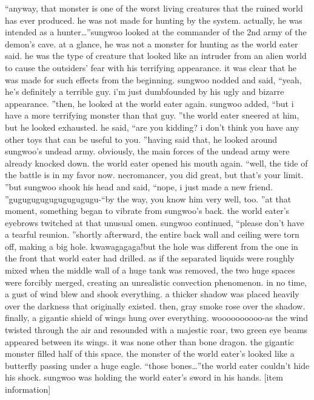 “anyway, that monster is one of the worst living creatures that the ruined world has ever produced.
 he was not made for hunting by the system.
 actually, he was intended as a hunter…”sungwoo looked at the commander of the 2nd army of the demon’s cave.
 at a glance, he was not a monster for hunting as the world eater said.
 he was the type of creature that looked like an intruder from an alien world to cause the outsiders’ fear with his terrifying appearance.
 it was clear that he was made for such effects from the beginning.
sungwoo nodded and said, “yeah, he’s definitely a terrible guy.
 i’m just dumbfounded by his ugly and bizarre appearance.
”then, he looked at the world eater again.
sungwoo added, “but i have a more terrifying monster than that guy.
”the world eater sneered at him, but he looked exhausted.
he said, “are you kidding? i don’t think you have any other toys that can be useful to you.
”having said that, he looked around sungwoo’s undead army.
 obviously, the main forces of the undead army were already knocked down.
the world eater opened his mouth again.
“well, the tide of the battle is in my favor now.
 necromancer, you did great, but that’s your limit.
”but sungwoo shook his head and said, “nope, i just made a new friend.
”gugugugugugugugugugu-“by the way, you know him very well, too.
”at that moment, something began to vibrate from sungwoo’s back.
 the world eater’s eyebrows twitched at that unusual omen.
sungwoo continued, “please don’t have a tearful reunion.
”shortly afterward, the entire back wall and ceiling were torn off, making a big hole.
kwawagagaga!but the hole was different from the one in the front that world eater had drilled.
as if the separated liquids were roughly mixed when the middle wall of a huge tank was removed, the two huge spaces were forcibly merged, creating an unrealistic convection phenomenon.
in no time, a gust of wind blew and shook everything.
 a thicker shadow was placed heavily over the darkness that originally existed.
 then, gray smoke rose over the shadow.
finally, a gigantic shield of wings hung over everything.
woooooooooo-as the wind twisted through the air and resounded with a majestic roar, two green eye beams appeared between its wings.
it was none other than bone dragon.
the gigantic monster filled half of this space.
 the monster of the world eater’s looked like a butterfly passing under a huge eagle.
“those bones…”the world eater couldn’t hide his shock.
 sungwoo was holding the world eater’s sword in his hands.
[item information]

